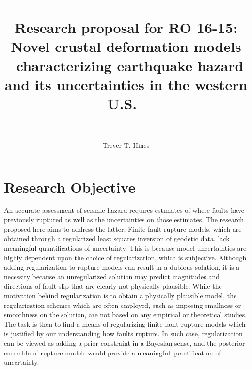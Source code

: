 \documentclass[12pt]{article}
\title{	
 \rule{\headwidth}{1.0pt}
 Research proposal for RO 16-15:
 Novel crustal deformation models \
 characterizing earthquake hazard and its uncertainties in the western U.S.\
 \rule{\headwidth}{1.0pt}
 \author{Trever T. Hines}}
\begin{document}
\maketitle

\section*{Research Objective}
An accurate assessment of seismic hazard requires estimates of where faults have previously ruptured as well as the uncertainties on those estimates.  The research proposed here aims to address the latter. Finite fault rupture models, which are obtained through a regularized least squares inversion of geodetic data, lack meaningful quantifications of uncertainty. This is because model uncertainties are highly dependent upon the choice of regularization, which is subjective.  Although adding regularization to rupture models can result in a dubious solution, it is a necessity because an unregularized  solution may predict magnitudes and directions of fault slip that are clearly not physically plausible.  While the motivation behind regularization is to obtain a physically plausible model, the regularization schemes which are often employed, such as imposing smallness or smoothness on the solution, are not based on any empirical or theoretical studies.  The task is then to find a means of regularizing finite fault rupture models which is justified by our understanding how faults rupture.  In such case, regularization can be viewed as adding a prior constraint in a Bayesian sense, and the posterior ensemble of rupture models would provide a meaningful quantification of uncertainty.
\end{document}
